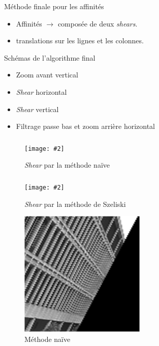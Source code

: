 \documentclass[c,12pt]{beamer}
\newcommand{\ra}[0]{\rightarrow}
\newcommand{\fig}[3]{\begin{figure} \texttt{[image: \#2]}\caption{#3}\end{figure}}
\newcommand{\fram}[2]{\begin{frame} \frametitle{#1} #2 \end{frame}}
\begin{document}
\begin{frame}{Méthode finale pour les affinités}
\begin{itemize}
\item Affinités $\ra$ composée de deux \emph{shears}.
\item translations sur les lignes et les colonnes.
\end{itemize}

\begin{block}{Schémas de l'algorithme final}

\begin{itemize}
\item Zoom avant vertical
\item \emph{Shear} horizontal
\item \emph{Shear} vertical
\item Filtrage passe bas et zoom arrière horizontal
\end{itemize}

\end{block}

\end{frame}



\fram{}{\fig{0.4}{shearAliase.png}{\emph{Shear} par la méthode naïve}}

\fram{}{\fig{0.4}{shearPasAliase.png}{\emph{Shear} par la méthode de Szeliski}}

\begin{frame}
\begin{figure}
\centering
\includegraphics[width=6cm]{zoom_shear_aliase.png}
\caption{Méthode naïve}
\end{figure}
\end{frame}
\end{document}
